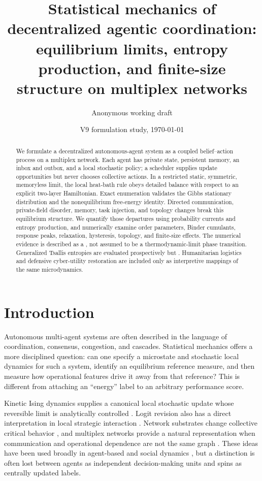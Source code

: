 \documentclass[12pt]{article}
\title{Statistical mechanics of decentralized agentic coordination:\\
equilibrium limits, entropy production, and finite-size structure on multiplex networks}
\author{Anonymous working draft}
\date{V9 formulation study, \today}
\begin{document}
\maketitle

\begin{abstract}
We formulate a decentralized autonomous-agent system as a coupled belief--action
process on a multiplex network. Each agent has private state, persistent memory,
an inbox and outbox, and a local stochastic policy; a scheduler supplies update
opportunities but never chooses collective actions. In a restricted static,
symmetric, memoryless limit, the local heat-bath rule obeys detailed balance
with respect to an explicit two-layer Hamiltonian. Exact enumeration validates
the Gibbs stationary distribution and the nonequilibrium free-energy identity.
Directed communication, private-field disorder, memory, task injection, and
topology changes break this equilibrium structure. We quantify those departures
using probability currents and entropy production, and numerically examine order
parameters, Binder cumulants, response peaks, relaxation, hysteresis, topology,
and finite-size effects. The numerical evidence is described as a
\ResultTransitionLanguage, not assumed to be a thermodynamic-limit phase
transition. Generalized Tsallis entropies are evaluated prospectively but
\ResultTsallisSummary. Humanitarian logistics and defensive cyber-utility
restoration are included only as interpretive mappings of the same microdynamics.
\end{abstract}

\section{Introduction}

Autonomous multi-agent systems are often described in the language of
coordination, consensus, congestion, and cascades. Statistical mechanics offers
a more disciplined question: can one specify a microstate and stochastic local
dynamics for such a system, identify an equilibrium reference measure, and then
measure how operational features drive it away from that reference? This is
different from attaching an ``energy'' label to an arbitrary performance score.

Kinetic Ising dynamics supplies a canonical local stochastic update whose
reversible limit is analytically controlled \cite{glauber1963}. Logit revision
also has a direct interpretation in local strategic interaction
\cite{blume1993}. Network substrates change collective critical behavior
\cite{dorogovtsev2008}, and multiplex networks provide a natural representation
when communication and operational dependence are not the same graph
\cite{kivela2014}. These ideas have been used broadly in agent-based and social
dynamics \cite{castellano2009}, but a distinction is often lost between agents
as independent decision-making units and spins as centrally updated labels.
\end{document}
